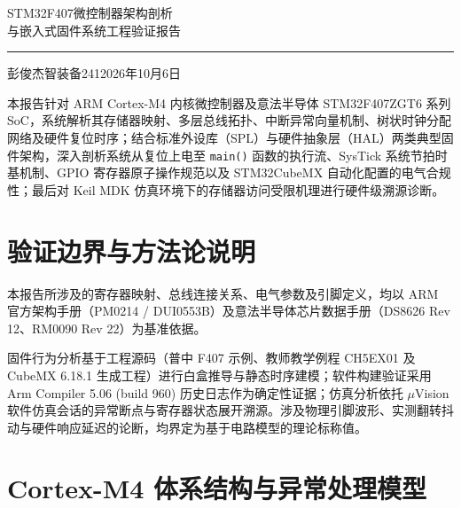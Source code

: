 \documentclass[11pt,a4paper]{ctexart}
\begin{document}
\thispagestyle{plain}
\begin{center}
  {\heiti\color{accent}STM32F407微控制器架构剖析\\[4pt]与嵌入式固件系统工程验证报告\par}
  \vspace{8pt}
  {\color{accent!55}\rule{0.32\textwidth}{1pt}}\par
  \vspace{6pt}
  {\small 彭俊杰\quad 智装备241\quad 2026年10月6日\par}
\end{center}
\vspace{4pt}

\begin{absbox}
本报告针对 ARM Cortex-M4 内核微控制器及意法半导体 STM32F407ZGT6 系列 SoC，系统解析其存储器映射、多层总线拓扑、中断异常向量机制、树状时钟分配网络及硬件复位时序；结合标准外设库（SPL）与硬件抽象层（HAL）两类典型固件架构，深入剖析系统从复位上电至 \texttt{main()} 函数的执行流、SysTick 系统节拍时基机制、GPIO 寄存器原子操作规范以及 STM32CubeMX 自动化配置的电气合规性；最后对 Keil MDK 仿真环境下的存储器访问受限机理进行硬件级溯源诊断。
\end{absbox}

\section*{验证边界与方法论说明}
本报告所涉及的寄存器映射、总线连接关系、电气参数及引脚定义，均以 ARM 官方架构手册（PM0214 / DUI0553B）及意法半导体芯片数据手册（DS8626 Rev 12、RM0090 Rev 22）为基准依据。

固件行为分析基于工程源码（普中 F407 示例、教师教学例程 CH5EX01 及 CubeMX 6.18.1 生成工程）进行白盒推导与静态时序建模；软件构建验证采用 Arm Compiler 5.06 (build 960) 历史日志作为确定性证据；仿真分析依托 $\mu$Vision 软件仿真会话的异常断点与寄存器状态展开溯源。涉及物理引脚波形、实测翻转抖动与硬件响应延迟的论断，均界定为基于电路模型的理论标称值。

\vspace{2pt}
\tableofcontents

\clearpage
\section{Cortex-M4 体系结构与异常处理模型}
\end{document}
